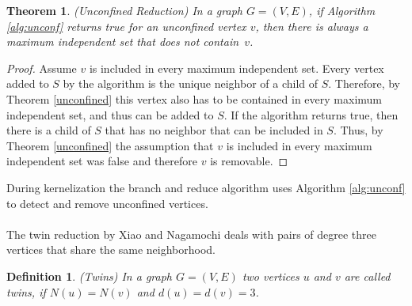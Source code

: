 \documentclass[12pt,a4paper,twoside]{scrartcl}
\newtheorem{theorem}{Theorem}
\newtheorem{definition}{Definition}
\numberwithin{equation}{section}
\begin{document}
\begin{theorem}(Unconfined Reduction) In a graph $G=(V,E)$, if Algorithm \ref{alg:unconf} returns true for an unconfined vertex $v$, then there is always a maximum independent set that does not contain~$v$.
\end{theorem}
\begin{proof}
	Assume $v$ is included in every maximum independent set. Every vertex added to $S$ by the algorithm is the unique neighbor of a child of $S$. Therefore, by Theorem \ref{unconfined} this vertex also has to be contained in every maximum independent set, and thus can be added to $S$. If the algorithm returns true, then there is a child of $S$ that has no neighbor that can be included in $S$. Thus, by Theorem \ref{unconfined} the assumption that $v$ is included in every maximum independent set was false and therefore $v$ is removable.
\end{proof}
During kernelization the branch and reduce algorithm uses Algorithm \ref{alg:unconf} to detect and remove unconfined vertices.\paragraph{}
The twin reduction by Xiao and Nagamochi \cite{XiaoUnconfined} deals with pairs of degree three vertices that share the same neighborhood.

\begin{definition}(Twins)
	In a graph $G=(V,E)$ two vertices $u$ and $v$ are called twins, if $N(u) = N(v)$ and $d(u) = d(v) = 3$.
\end{definition}
\end{document}
